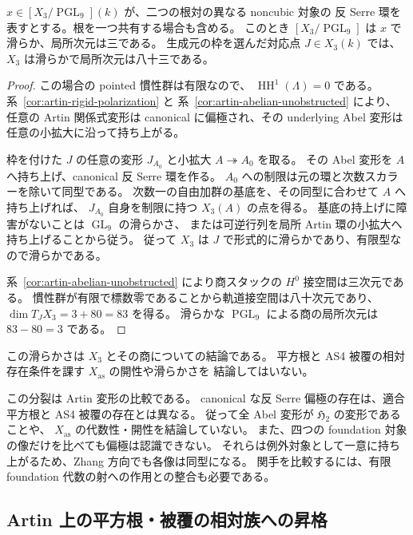 \begin{corollary}[非一致根対での関係式空間の滑らかさ]
\label{cor:artin-noncubic-relations-smooth}
$x\in[X_3/\operatorname{PGL}_9](k)$ が、二つの根対の異なる noncubic 対象の
反 Serre 環を表すとする。根を一つ共有する場合も含める。
このとき $[X_3/\operatorname{PGL}_9]$ は $x$ で滑らか、局所次元は三である。
生成元の枠を選んだ対応点 $J\in X_3(k)$ では、$X_3$ は滑らかで局所次元は八十三である。
\end{corollary}
\begin{proof}
この場合の pointed 慣性群は有限なので、
$\operatorname{HH}^{1}(\Lambda)=0$ である。
系~\ref{cor:artin-rigid-polarization} と
系~\ref{cor:artin-abelian-unobstructed} により、
任意の Artin 関係式変形は canonical に偏極され、その underlying Abel 変形は
任意の小拡大に沿って持ち上がる。

枠を付けた $J$ の任意の変形 $J_{A_0}$ と小拡大 $A\twoheadrightarrow A_0$ を取る。
その Abel 変形を $A$ へ持ち上げ、canonical 反 Serre 環を作る。
$A_0$ への制限は元の環と次数スカラーを除いて同型である。
次数一の自由加群の基底を、その同型に合わせて $A$ へ持ち上げれば、
$J_{A_0}$ 自身を制限に持つ $X_3(A)$ の点を得る。
基底の持上げに障害がないことは $\operatorname{GL}_9$ の滑らかさ、
または可逆行列を局所 Artin 環の小拡大へ持ち上げることから従う。
従って $X_3$ は $J$ で形式的に滑らかであり、有限型なので滑らかである。

系~\ref{cor:artin-abelian-unobstructed} により商スタックの $H^0$ 接空間は三次元である。
慣性群が有限で標数零であることから軌道接空間は八十次元であり、
$\dim T_JX_3=3+80=83$ を得る。
滑らかな $\operatorname{PGL}_9$ による商の局所次元は $83-80=3$ である。
\end{proof}

この滑らかさは $X_3$ とその商についての結論である。
平方根と AS4 被覆の相対存在条件を課す $X_{\mathrm{as}}$ の開性や滑らかさを
結論してはいない。

\begin{remark}
この分裂は Artin 変形の比較である。
canonical な反 Serre 偏極の存在は、適合平方根と AS4 被覆の存在とは異なる。
従って全 Abel 変形が $\mathfrak H_2$ の変形であることや、
$X_{\mathrm{as}}$ の代数性・開性を結論していない。
また、四つの foundation 対象の像だけを比べても偏極は認識できない。
それらは例外対象として一意に持ち上がるため、Zhang 方向でも各像は同型になる。
関手を比較するには、有限 foundation 代数の射への作用との整合も必要である。
\end{remark}

\subsection{Artin 上の平方根・被覆の相対族への昇格}
\label{subsec:artin-relative-promotion}

